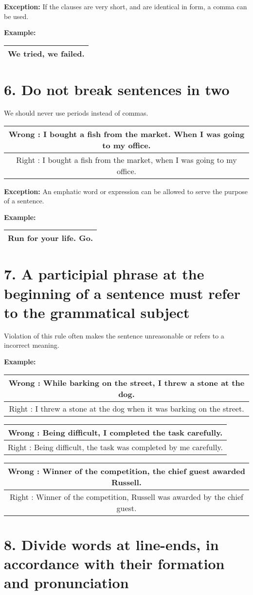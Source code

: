 \documentclass{report}
\newcommand{\SingleRowSingleCol}[1]{
    \begin{center}
    \begin{tabular}{|c|}
     \hline
     #1\\\hline
    \end{tabular}
    \end{center}
}
\newcommand{\DoubleRowSingleCol}[2]{
    \begin{center}
    \begin{tabular}{|c|}
     \hline
     #1\\\hline
     #2\\\hline
    \end{tabular}
    \end{center}
}
\begin{document}
\newpage

{\Large\textbf{Exception:}}
If the clauses are very short, and are identical in form, a comma can be used.
\endgraf\bigskip

\textbf{Example:}
\SingleRowSingleCol{We tried, we failed.}
\endgraf\bigskip

\section*{6. Do not break sentences in two}
We should never use periods instead of commas. 
\DoubleRowSingleCol
{Wrong : I bought a fish from the market. When I was going to my office.}
{Right : I bought a fish from the market, when I was going to my office.}

{\Large\textbf{Exception:}}
An emphatic word or expression can be allowed to serve the purpose of a sentence.
\endgraf\bigskip

\textbf{Example:}
\SingleRowSingleCol{Run for your life. Go.}
\endgraf\bigskip

\section*{7. A participial phrase at the beginning of a sentence must refer to the grammatical subject}
Violation of this rule often makes the sentence unreasonable or refers to a incorrect meaning.

\textbf{Example:}
\DoubleRowSingleCol
{Wrong : While barking on the street, I threw a stone at the dog.}
{Right : I threw a stone at the dog when it was barking on the street.}
\bigskip

\DoubleRowSingleCol
{Wrong : Being difficult, I completed the task carefully.}
{Right : Being difficult, the task was completed by me carefully.}
\bigskip

\DoubleRowSingleCol
{Wrong : Winner of the competition, the chief guest awarded Russell.}
{Right : Winner of the competition, Russell was awarded by the chief guest.}
\newpage

\section*{8. Divide words at line-ends, in accordance with their formation and
pronunciation}
\end{document}
